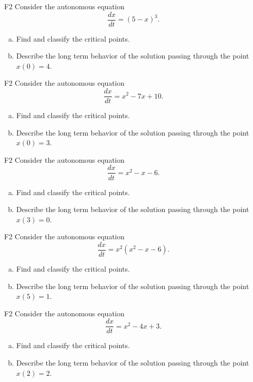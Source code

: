 \begin{problem}{F2}
Consider the autonomous equation
\[
\frac{dx}{dt} = (5 - x)^3.
\]
\begin{enumerate}[(a)]
\item Find and classify the critical points.
\item Describe the long term behavior of the solution passing through the point $x(0)=4$.
\end{enumerate}
\end{problem}

\begin{problem}{F2}
Consider the autonomous equation
\[
\frac{dx}{dt} = x^2 - 7x + 10.
\]
\begin{enumerate}[(a)]
\item Find and classify the critical points.
\item Describe the long term behavior of the solution passing through the point $x(0)=3$.
\end{enumerate}
\end{problem}

\begin{problem}{F2}
Consider the autonomous equation
\[
\frac{dx}{dt} = x^2 - x - 6.
\]
\begin{enumerate}[(a)]
\item Find and classify the critical points.
\item Describe the long term behavior of the solution passing through the point $x(3)=0$.
\end{enumerate}
\end{problem}

\begin{problem}{F2}
Consider the autonomous equation
\[
\frac{dx}{dt} = x^2(x^2 - x - 6).
\]
\begin{enumerate}[(a)]
\item Find and classify the critical points.
\item Describe the long term behavior of the solution passing through the point $x(5)=1$.
\end{enumerate}
\end{problem}

\begin{problem}{F2}
Consider the autonomous equation
\[
\frac{dx}{dt} = x^2 - 4x + 3.
\]
\begin{enumerate}[(a)]
\item Find and classify the critical points.
\item Describe the long term behavior of the solution passing through the point $x(2)=2$.
\end{enumerate}
\end{problem}

